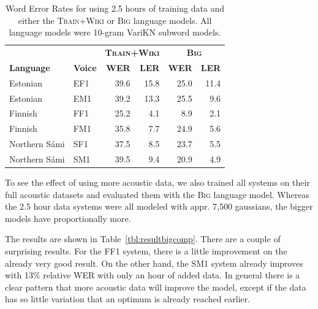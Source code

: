 \documentclass[b5paper]{article}
\newcommand{\ns}{Northern Sámi}
\newcommand{\ds}[1]{\textsc{#1}}
\begin{document}
\begin{table}
\centering
\begin{tabular}{ll|rr|rr}
 & & \multicolumn{2}{|c|}{\textbf{\ds{Train+Wiki}}}  & \multicolumn{2}{|c}{\textbf{\ds{Big}}}\\
\textbf{Language} & \textbf{Voice} & \textbf{WER} & \textbf{LER}& \textbf{{WER}} & \textbf{LER}\\\hline
Estonian & EF1 & 39.6 & 15.8 & 25.0 & 11.4\\
Estonian & EM1 & 39.2 & 13.3 & 25.5 & 9.6\\
Finnish & FF1 & 25.2 &4.1& 8.9 & 2.1  \\
Finnish & FM1 & 35.8 & 7.7 & 24.9 &  5.6 \\
\ns & SF1 & 37.5 & 8.5 & 23.7  & 5.5 \\
\ns & SM1 & 39.5 & 9.4& 20.9 & 4.9  \\
\end{tabular}
\caption{Word Error Rates for using 2.5 hours of training data and either the \ds{Train+Wiki} or \ds{Big} language models. All language models were 10-gram VariKN subword models.\label{tbl:resultssmallcomp}}
\end{table}

To see the effect of using more acoustic data, we also trained all systems on their full acoustic datasets and evaluated them with the \ds{Big} language model. Whereas the 2.5 hour data systems were all modeled with appr. 7,500 gaussians, the bigger models have proportionally more. 

The results are shown in Table~\ref{tbl:resultbigcomp}.  There are a couple of surprising results. For the FF1 system, there is a little improvement on the already very good result. On the other hand, the SM1 system already improves with 13\% relative WER with only an hour of added data. In general there is a clear pattern that more acoustic data will improve the model, except if the data has so little variation that an optimum is already reached earlier.
\end{document}
